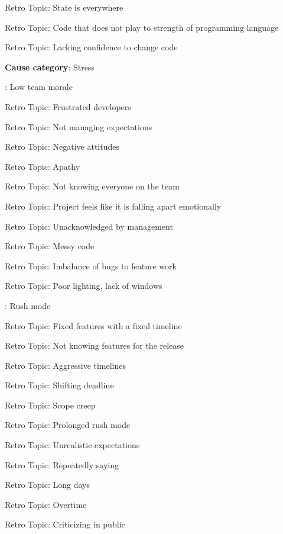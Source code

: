 \quad \quad \quad \quad Retro Topic: State is everywhere

\quad \quad \quad \quad Retro Topic: Code that does not play to strength of programming language

\quad \quad \quad \quad Retro Topic: Lacking confidence to change code

\quad \textbf{Cause category}: Stress

\quad {}: Low team morale

\quad \quad \quad Retro Topic: Frustrated developers

\quad \quad \quad Retro Topic: Not managing expectations

\quad \quad \quad Retro Topic: Negative attitudes

\quad \quad \quad Retro Topic: Apathy

\quad \quad \quad Retro Topic: Not knowing everyone on the team

\quad \quad \quad Retro Topic: Project feels like it is falling apart emotionally

\quad \quad \quad Retro Topic: Unacknowledged by management

\quad \quad \quad Retro Topic: Messy code

\quad \quad \quad Retro Topic: Imbalance of bugs to feature work

\quad \quad \quad Retro Topic: Poor lighting, lack of windows

\quad {}: Rush mode

\quad \quad \quad Retro Topic: Fixed features with a fixed timeline

\quad \quad \quad Retro Topic: Not knowing features for the release

\quad \quad \quad Retro Topic: Aggressive timelines

\quad \quad \quad Retro Topic: Shifting deadline

\quad \quad \quad Retro Topic: Scope creep

\quad \quad \quad Retro Topic: Prolonged rush mode

\quad \quad \quad Retro Topic: Unrealistic expectations

\quad \quad \quad Retro Topic: Repeatedly saying 

\quad \quad \quad Retro Topic: Long days

\quad \quad \quad Retro Topic: Overtime

\quad \quad Retro Topic: Criticizing in public


